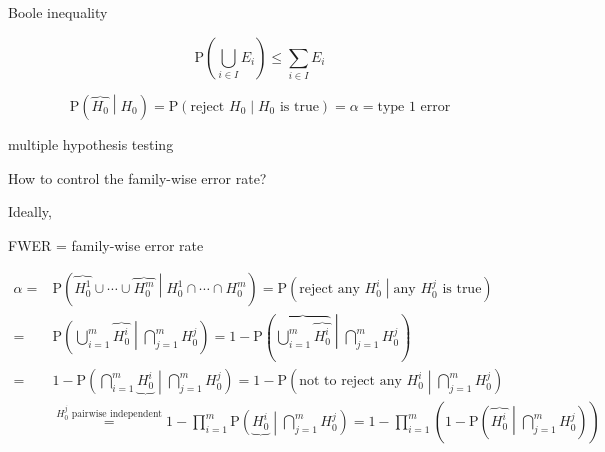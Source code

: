 \documentclass[
]{book}
\theoremstyle{definition}
\theoremstyle{definition}
\theoremstyle{definition}
\theoremstyle{definition}
\theoremstyle{remark}
\begin{document}
Boole inequality

\[
\mathrm{P}\left(\bigcup\limits _{i\in I}E_{{\scriptscriptstyle i}}\right)\le\sum\limits _{i\in I}E_{{\scriptscriptstyle i}}
\]

\[
\mathrm{P}\left(\overbrace{H_{{\scriptscriptstyle 0}}}\middle|H_{{\scriptscriptstyle 0}}\right)=\mathrm{P}\left(\text{reject }H_{{\scriptscriptstyle 0}}\middle|H_{{\scriptscriptstyle 0}}\text{ is true}\right)=\alpha=\text{type 1 error}
\]

multiple hypothesis testing

How to control the family-wise error rate?

Ideally,

FWER = family-wise error rate

\[
\begin{aligned}
\alpha= & \mathrm{P}\left(\overbrace{H_{{\scriptscriptstyle 0}}^{{\scriptscriptstyle 1}}}\cup\cdots\cup\overbrace{H_{{\scriptscriptstyle 0}}^{{\scriptscriptstyle m}}}\middle|H_{{\scriptscriptstyle 0}}^{{\scriptscriptstyle 1}}\cap\cdots\cap H_{{\scriptscriptstyle 0}}^{{\scriptscriptstyle m}}\right)=\mathrm{P}\left(\text{reject any }H_{{\scriptscriptstyle 0}}^{{\scriptscriptstyle i}}\middle|\text{any }H_{{\scriptscriptstyle 0}}^{{\scriptscriptstyle j}}\text{ is true}\right)\\
= & \mathrm{P}\left(\bigcup\limits _{i=1}^{m}\overbrace{H_{{\scriptscriptstyle 0}}^{{\scriptscriptstyle i}}}\middle|\bigcap\limits _{j=1}^{m}H_{{\scriptscriptstyle 0}}^{{\scriptscriptstyle j}}\right)=1-\mathrm{P}\left(\overbrace{\bigcup\limits _{i=1}^{m}\overbrace{H_{{\scriptscriptstyle 0}}^{{\scriptscriptstyle i}}}}\middle|\bigcap\limits _{j=1}^{m}H_{{\scriptscriptstyle 0}}^{{\scriptscriptstyle j}}\right)\\
= & 1-\mathrm{P}\left(\bigcap\limits _{i=1}^{m}\underbrace{H_{{\scriptscriptstyle 0}}^{{\scriptscriptstyle i}}}\middle|\bigcap\limits _{j=1}^{m}H_{{\scriptscriptstyle 0}}^{{\scriptscriptstyle j}}\right)=1-\mathrm{P}\left(\text{not to reject any }H_{{\scriptscriptstyle 0}}^{{\scriptscriptstyle i}}\middle|\bigcap\limits _{j=1}^{m}H_{{\scriptscriptstyle 0}}^{{\scriptscriptstyle j}}\right)\\
 & \overset{H_{{\scriptscriptstyle 0}}^{{\scriptscriptstyle j}}\text{ pairwise independent}}{=}1-\prod\limits _{i=1}^{m}\mathrm{P}\left(\underbrace{H_{{\scriptscriptstyle 0}}^{{\scriptscriptstyle i}}}\middle|\bigcap\limits _{j=1}^{m}H_{{\scriptscriptstyle 0}}^{{\scriptscriptstyle j}}\right)=1-\prod\limits _{i=1}^{m}\left(1-\mathrm{P}\left(\overbrace{H_{{\scriptscriptstyle 0}}^{{\scriptscriptstyle i}}}\middle|\bigcap\limits _{j=1}^{m}H_{{\scriptscriptstyle 0}}^{{\scriptscriptstyle j}}\right)\right)\\

\end{aligned}\]
\end{document}
